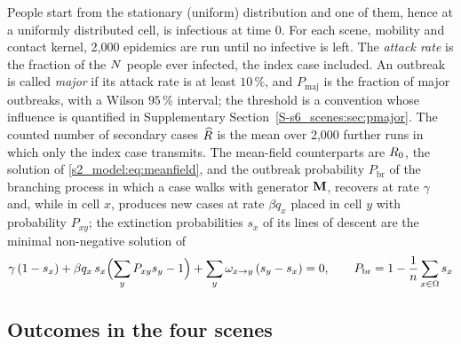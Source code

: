People start from the stationary (uniform) distribution and one of them, hence at a uniformly distributed
cell, is infectious at time $0$. For each scene, mobility and contact kernel, 2{,}000 epidemics are run until no
infective is left. The \emph{attack rate} is the fraction of the $N$ people ever infected, the index case
included. An outbreak is called \emph{major} if its attack rate is at least $10\,\%$, and $P_{\mathrm{maj}}$ is
the fraction of major outbreaks, with a Wilson $95\,\%$ interval; the threshold is a convention whose influence
is quantified in Supplementary Section~\ref{S-s6_scenes:sec:pmajor}. The counted number of secondary cases
$\widehat{R}$ is the mean over 2{,}000 further runs in which only the index case transmits. The mean-field
counterparts are $R_0$, the solution of \eqref{s2_model:eq:meanfield}, and the outbreak probability
$P_{\mathrm{br}}$ of the branching process in which a case walks with generator $\mathbf{M}$, recovers at rate
$\gamma$ and, while in cell $x$, produces new cases at rate $\beta q_x$ placed in cell $y$ with probability
$P_{xy}$; the extinction probabilities $s_x$ of its lines of descent are the minimal non-negative solution
\citep{andersson2000stochastic} of
\begin{equation}\label{s6_scenes:eq:branching}
  \gamma\,(1-s_x)+\beta q_x\,s_x\Bigl(\sum_{y}P_{xy}s_y-1\Bigr)+\sum_{y}\omega_{x\to y}\,(s_y-s_x)=0 ,
  \qquad P_{\mathrm{br}}=1-\frac1{n}\sum_{x\in\Omega}s_x
\end{equation}

\subsection{Outcomes in the four scenes}\label{s6_scenes:sec:outcomes}

